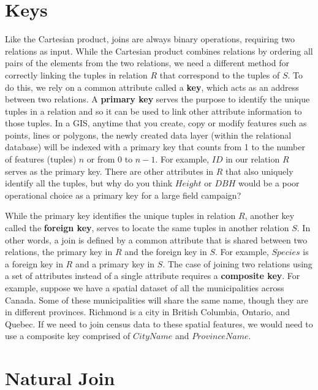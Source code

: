 \documentclass[
]{book}
\begin{document}
\hypertarget{keys}{%
\section{Keys}\label{keys}}

Like the Cartesian product, joins are always binary operations, requiring two relations as input. While the Cartesian product combines relations by ordering all pairs of the elements from the two relations, we need a different method for correctly linking the tuples in relation \(R\) that correspond to the tuples of \(S\). To do this, we rely on a common attribute called a \textbf{key}, which acts as an address between two relations. A \textbf{primary key} serves the purpose to identify the unique tuples in a relation and so it can be used to link other attribute information to those tuples. In a GIS, anytime that you create, copy or modify features such as points, lines or polygons, the newly created data layer (within the relational database) will be indexed with a primary key that counts from 1 to the number of features (tuples) \(n\) or from 0 to \(n-1\). For example, \(ID\) in our relation \(R\) serves as the primary key. There are other attributes in \(R\) that also uniquely identify all the tuples, but why do you think \(Height\) or \(DBH\) would be a poor operational choice as a primary key for a large field campaign?

While the primary key identifies the unique tuples in relation \(R\), another key called the \textbf{foreign key}, serves to locate the same tuples in another relation \(S\). In other words, a join is defined by a common attribute that is shared between two relations, the primary key in \(R\) and the foreign key in \(S\). For example, \(Species\) is a foreign key in \(R\) and a primary key in \(S\). The case of joining two relations using a set of attributes instead of a single attribute requires a \textbf{composite key}. For example, suppose we have a spatial dataset of all the municipalities across Canada. Some of these municipalities will share the same name, though they are in different provinces. Richmond is a city in British Columbia, Ontario, and Quebec. If we need to join census data to these spatial features, we would need to use a composite key comprised of \(CityName\) and \(ProvinceName\).

\hypertarget{natural-join}{%
\section{Natural Join}\label{natural-join}}
\end{document}
